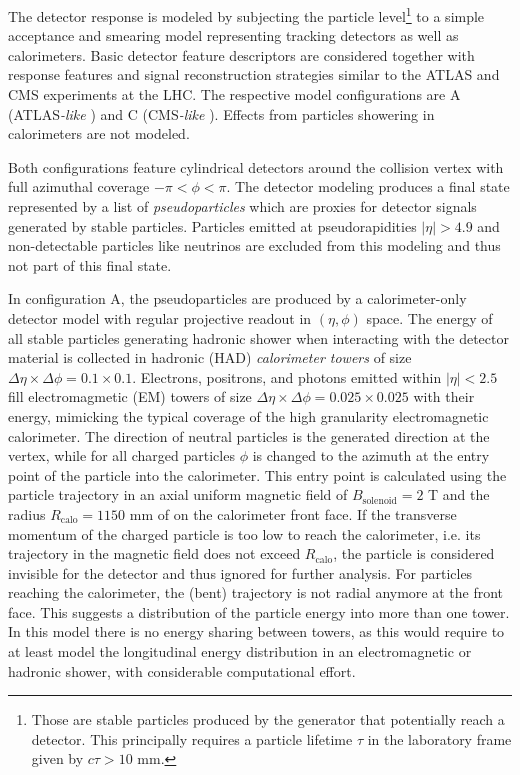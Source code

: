 \documentclass[11pt,letterpaper]{article}
\begin{document}
The detector response is modeled by subjecting the particle level\footnote{Those are stable particles produced by the generator that potentially reach a detector. 
This principally requires a particle lifetime $\tau$ in the laboratory frame given by $c\tau > 10$ mm.}
to a simple acceptance and smearing model representing tracking detectors as well as calorimeters.
Basic detector feature descriptors are considered together with response features and signal reconstruction strategies similar to the ATLAS and CMS experiments at the LHC.
The respective model configurations are A (ATLAS\emph{-like} \cite{PERF-2007-01}) and C (CMS\emph{-like} \cite{CMS-TDR-08-001}).
Effects from particles showering in calorimeters are not modeled. 

Both configurations feature cylindrical detectors around the collision vertex with full azimuthal coverage $-\pi < \phi < \pi$.
The detector modeling produces a final state represented by a list of \emph{pseudoparticles} which are proxies for detector signals generated by stable particles.
Particles emitted at pseudorapidities $|\eta| > 4.9$ and non-detectable particles like neutrinos are excluded from this modeling and thus not part of this final state. 

In configuration A, the pseudoparticles are produced by a calorimeter-only detector model with regular projective readout in $(\eta,\phi)$ space. 
The energy of all stable particles generating hadronic shower when interacting with the detector material is collected 
in hadronic (HAD) \emph{calorimeter towers} of size $\Delta\eta\times\Delta\phi = 0.1\times0.1$. 
Electrons, positrons, and photons emitted within $|\eta| < 2.5$ fill electromagmetic (EM) towers of size $\Delta\eta\times\Delta\phi = 0.025\times0.025$ with their energy, mimicking the typical
coverage of the high granularity electromagnetic calorimeter. 
The direction of neutral particles is the generated direction at the vertex, while for all charged particles $\phi$ is changed to the azimuth at the entry point of the particle
into the calorimeter. 
This entry point is calculated using the particle trajectory in an axial uniform magnetic field of $B_{\text{solenoid}} = 2$%
 T and the radius $R_{\text{calo}} = 1150$ mm of
on the calorimeter front face.
If the transverse momentum of the charged particle  is too low to reach the calorimeter, i.e. its trajectory in the magnetic field does not exceed $R_{\text{calo}}$, 
the particle is considered invisible for the detector and thus ignored for further analysis.   
For particles reaching the calorimeter, the (bent) trajectory is not radial anymore at the front face.
This suggests a distribution of the particle energy into more than one tower.
In this model there is no energy sharing between towers, as this would require to at least model the longitudinal energy distribution in an electromagnetic or hadronic shower, with considerable computational effort.
\end{document}

